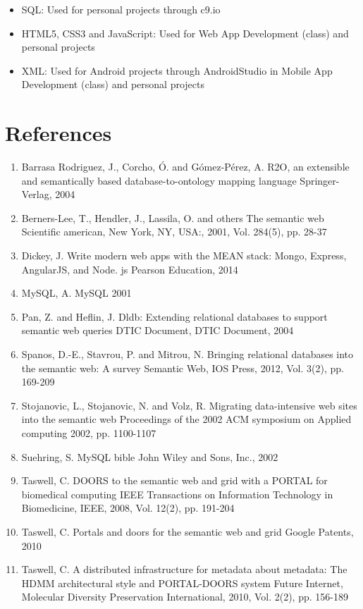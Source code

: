 \documentclass[12pt]{article}
\begin{document}
\begin{itemize}
\item SQL: Used for personal projects through c9.io
\item HTML5, CSS3 and JavaScript: Used for Web App Development (class) and personal projects
\item XML: Used for Android projects through AndroidStudio in Mobile App Development (class) and personal projects
\end{itemize}


\section{References}
\begin{enumerate}
\item Barrasa Rodriguez, J., Corcho, Ó. and Gómez-Pérez, A.
R2O, an extensible and semantically based database-to-ontology mapping language
Springer-Verlag, 2004
\item Berners-Lee, T., Hendler, J., Lassila, O. and others
The semantic web
Scientific american, New York, NY, USA:, 2001, Vol. 284(5), pp. 28-37
\item Dickey, J.
Write modern web apps with the MEAN stack: Mongo, Express, AngularJS, and Node. js
Pearson Education, 2014
\item MySQL, A.
MySQL
2001
\item Pan, Z. and Heflin, J.
Dldb: Extending relational databases to support semantic web queries
DTIC Document, DTIC Document, 2004
\item Spanos, D.-E., Stavrou, P. and Mitrou, N.
Bringing relational databases into the semantic web: A survey
Semantic Web, IOS Press, 2012, Vol. 3(2), pp. 169-209
\item Stojanovic, L., Stojanovic, N. and Volz, R.
Migrating data-intensive web sites into the semantic web
Proceedings of the 2002 ACM symposium on Applied computing
2002, pp. 1100-1107
\item Suehring, S.
MySQL bible
John Wiley and Sons, Inc., 2002
\item Taswell, C.
DOORS to the semantic web and grid with a PORTAL for biomedical computing
IEEE Transactions on Information Technology in Biomedicine, IEEE, 2008, Vol. 12(2), pp. 191-204
\item Taswell, C.
Portals and doors for the semantic web and grid
Google Patents, 2010
\item Taswell, C.
A distributed infrastructure for metadata about metadata: The HDMM architectural style and PORTAL-DOORS system
Future Internet, Molecular Diversity Preservation International, 2010, Vol. 2(2), pp. 156-189
\end{enumerate}




\end{document}

